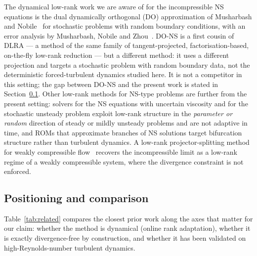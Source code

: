 The dynamical low-rank work we are aware of for the incompressible NS
equations is the dual dynamically orthogonal (DO) approximation of Musharbash
and Nobile~\cite{musharbash2018} for stochastic problems with random boundary
conditions, with an error analysis by Musharbash, Nobile and
Zhou~\cite{musharbash2015}. DO-NS is a first cousin of DLRA --- a method of
the same family of tangent-projected, factorisation-based, on-the-fly
low-rank reduction --- but a different method: it uses a different projection
and targets a stochastic problem with random boundary data, not the
deterministic forced-turbulent dynamics studied here. It is not a competitor
in this setting; the gap between DO-NS and the present work is stated in
Section~\ref{sec:positioning}. Other low-rank methods for NS-type problems
are further from the present setting: solvers for the NS equations with
uncertain viscosity \cite{lee2017} and for the stochastic unsteady problem
\cite{elman2019low} exploit low-rank structure in the \emph{parameter or
random} direction of steady or mildly unsteady problems and are not adaptive
in time, and ROMs that approximate branches of NS solutions
\cite{olshanskii2024} target bifurcation structure rather than turbulent
dynamics. A low-rank projector-splitting method for weakly compressible
flow~\cite{einkemmer2018} recovers the incompressible limit as a low-rank
regime of a weakly compressible system, where the divergence constraint is
not enforced.

\subsection{Positioning and comparison}
\label{sec:positioning}

Table~\ref{tab:related} compares the closest prior work along the axes
that matter for our claim: whether the method is dynamical (online rank
adaptation), whether it is exactly divergence-free by construction, and
whether it has been validated on high-Reynolds-number turbulent dynamics.

